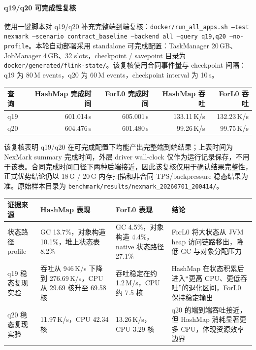\documentclass[a4paper,11pt]{article}
\begin{document}
\paragraph{q19/q20 可完成性复核}
使用一键脚本对 q19/q20 补充完整端到端复核：\texttt{docker/run\_all\_apps.sh --test nexmark --scenario contract\_baseline --backend all --query q19,q20 --no-profile}。本轮自动部署采用 standalone 可完成配置：TaskManager 20\,GB、JobManager 4\,GB、32 slots，checkpoint / savepoint 目录为 \texttt{docker/generated/flink-state/}。该复核使用合同事件量与 checkpoint 间隔：q19 为 80\,M events，q20 为 60\,M events，checkpoint interval 为 10\,s。

\begin{center}
\small
\setlength{\tabcolsep}{4pt}
\begin{tabular}{@{}lrrrr@{}}
\toprule
\textbf{查询} & \textbf{HashMap 完成时间} & \textbf{ForL0 完成时间} & \textbf{HashMap 吞吐} & \textbf{ForL0 吞吐} \\
\midrule
q19 & 601.014\,s & 605.001\,s & 133.11\,K/s & 132.23\,K/s \\
q20 & 604.476\,s & 601.480\,s & 99.26\,K/s & 99.75\,K/s \\
\bottomrule
\end{tabular}
\end{center}

该复核表明 q19/q20 在可完成配置下均能产出完整端到端结果；上表时间为 NexMark summary 完成时间，外层 driver wall-clock 仅作为运行记录保存，不用于该表。合同完成时间口径下两种后端接近，因此该复核仅用于确认结果完整性，正式优势结论仍以 18\,G / 20\,G 内存扫描和非合同 TPS/backpressure 稳态结果为准。原始样本目录为 \texttt{benchmark/results/nexmark\_20260701\_200414/}。

\begin{center}
\small
\setlength{\tabcolsep}{4pt}
\begin{tabularx}{\textwidth}{L{3.0cm} L{4.0cm} L{4.0cm} X}
\toprule
\textbf{证据来源} & \textbf{HashMap 表现} & \textbf{ForL0 表现} & \textbf{结论} \\
\midrule
状态路径 profile & GC 13.7\%，对象构造 10.1\%，堆上状态表 8.2\% & GC 4.5\%，对象构造 4.4\%，native 状态路径 27.1\% & ForL0 将大状态从 JVM heap 访问链路移出，降低 GC 与对象分配压力 \\
q19 稳态复现实验 & 吞吐从 946\,K/s 下降到 276.69\,K/s，CPU 从 29.69 核升至 69.58 核 & 吞吐稳定在约 1.2\,M/s，CPU 约 7.5 核 & HashMap 在状态积累后进入“更高 CPU、更低吞吐”的退化区间，ForL0 保持稳定输出 \\
q20 稳态复现实验 & 11.97\,K/s，CPU 42.34 核 & 13.26\,K/s，CPU 3.29 核 & q20 的端到端吞吐接近，但 HashMap 消耗显著更多 CPU，体现资源效率边界 \\
\bottomrule
\end{tabularx}
\end{center}
\end{document}
